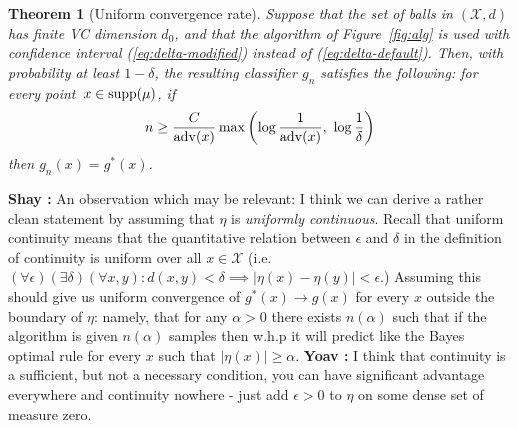 \documentclass{article}
\def\X{{\mathcal X}}
\def\supp{{\rm supp}}
\def\adv{{\rm adv}}
\newcommand{\eps}{\epsilon}
\newcommand{\algname}{\textsc{AKNN}}
\newtheorem{theorem}{Theorem}
\newcommand{\comment}[3]{{\color{#1} {\bf #2 :} #3}}
\newcommand{\shay}[1]{\comment{purple}{Shay}{#1}}
\newcommand{\yoav}[1]{\comment{green}{Yoav}{#1}}
\begin{document}


\begin{theorem} [Uniform convergence rate]
Suppose that the set of balls in $(\X,d)$ has finite VC dimension $d_0$, and that the algorithm of Figure~\ref{fig:alg} is used with confidence interval (\ref{eq:delta-modified}) instead of (\ref{eq:delta-default}). 
Then, with probability at least $1-\delta$, the resulting classifier $g_n$ satisfies the following: 
for every point~$x\in\supp(\mu)$, if
\[n \geq \frac{C}{\adv(x)} \max \left( \log \frac{1}{\adv(x)}, \ \log \frac{1}{\delta} \right)\]
then $g_n(x)=g^*(x)$.
\label{thm:uniform-rate}
\end{theorem}

\shay{An observation which may be relevant: 
I think we can derive a rather clean statement by assuming that $\eta$ is {\it uniformly continuous}.
Recall that uniform continuity means that the quantitative relation between $\eps$ and $\delta$
in the definition of continuity is uniform over all $x\in \X$ 
(i.e.\ $(\forall \epsilon)(\exists\delta)(\forall x,y):d(x,y)<\delta \implies \lvert\eta(x)-\eta(y) \rvert<\epsilon$.)
Assuming this should give us uniform convergence of $g^*(x)\to g(x)$ for every $x$ outside the boundary of $\eta$:
namely, that for any $\alpha>0$ there exists $n(\alpha)$ 
such that if the algorithm is given $n(\alpha)$ samples then w.h.p it will predict like the Bayes optimal rule
for every $x$ such that $\lvert\eta(x)\rvert \geq \alpha$. }
\yoav{I think that continuity is a sufficient, but not a necessary condition, you can have
  significant advantage everywhere and continuity nowhere - just add
  $\epsilon>0$ to $\eta$ on some dense set of measure zero.}
\end{document}

